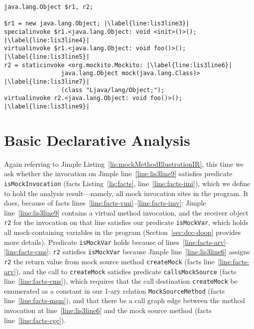 \begin{lstlisting}[basicstyle=\ttfamily, caption={Jimple Intermediate Representation for the code in Figure~\ref{fig:mockMethodIllustration}.},
basicstyle=\ttfamily, captionpos=b, label=lis:mockMethodIllustrationIR, escapechar=|, morekeywords={@Test, specialinvoke, virtualinvoke, staticinvoke}]
java.lang.Object $r1, r2;

$r1 = new java.lang.Object; |\label{line:lis3line3}|
specialinvoke $r1.<java.lang.Object: void <init>()>(); |\label{line:lis3line4}|
virtualinvoke $r1.<java.lang.Object: void foo()>(); |\label{line:lis3line5}|
r2 = staticinvoke <org.mockito.Mockito: |\label{line:lis3line6}|
				java.lang.Object mock(java.lang.Class)> |\label{line:lis3line7}|
				(class "Ljava/lang/Object;");
virtualinvoke r2.<java.lang.Object: void foo()>(); |\label{line:lis3line9}|
\end{lstlisting}

\section{Basic Declarative Analysis} 
\label{sec:motivating-example-dec}

Again referring to Jimple Listing~\ref{lis:mockMethodIllustrationIR}, this time we ask whether the invocation on Jimple line~\ref{line:lis3line9} satisfies predicate \texttt{isMockInvocation} (facts Listing~\ref{lis:facts}, line~\ref{line:facts-imi}), which we define to hold the analysis result---namely, all mock invocation sites in the program. It does, because of facts lines~\ref{line:facts-vmi}--\ref{line:facts-imv}: Jimple line~\ref{line:lis3line9} contains a virtual method invocation, and the receiver object \texttt{r2} for the invocation on that line satisfies our predicate \texttt{isMockVar}, which holds all mock-containing variables in the program (Section~\ref{sec:dec-doop} provides more details). Predicate \texttt{isMockVar} holds because of lines~\ref{line:facts-arv}--\ref{line:facts-cms}: \texttt{r2} satisfies \texttt{isMockVar} because Jimple line~\ref{line:lis3line6} assigns \texttt{r2} the return value from mock source method \texttt{createMock} (facts line~\ref{line:facts-arv}), and the call to \texttt{createMock} satisfies predicate \texttt{callsMockSource} (facts line~\ref{line:facts-cms}), which requires that the call destination \texttt{createMock} be enumerated as a constant in our 1-ary relation \texttt{MockSourceMethod} (facts line~\ref{line:facts-msm}), and that there be a call graph edge between the method invocation at line~\ref{line:lis3line6} and the mock source method (facts line~\ref{line:facts-cge}).


